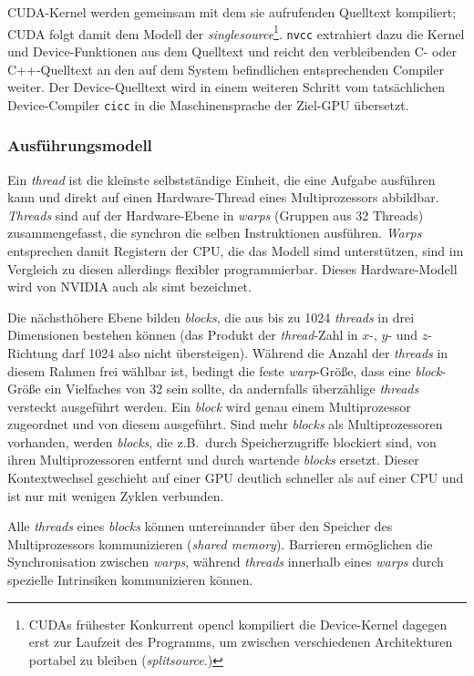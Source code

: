 CUDA-Kernel werden gemeinsam mit dem sie aufrufenden Quelltext kompiliert; CUDA
folgt damit dem Modell der \textit{\gls{singlesource}}\footnote{CUDAs frühester
Konkurrent \gls{opencl} kompiliert die Device-Kernel dagegen erst zur Laufzeit
des Programms, um zwischen verschiedenen Architekturen portabel zu bleiben
(\textit{\gls{splitsource}}.)}. \texttt{nvcc} extrahiert dazu die Kernel und
Device-Funktionen aus dem Quelltext und reicht den verbleibenden C- oder
C++-Quelltext an den auf dem System befindlichen entsprechenden Compiler
weiter. Der Device-Quelltext wird in einem weiteren Schritt vom tatsächlichen
Device-Compiler \texttt{cicc} in die Maschinensprache der Ziel-GPU übersetzt.

\subsubsection{Ausführungsmodell}

Ein \textit{thread} ist die kleinste selbstständige Einheit, die eine Aufgabe
ausführen kann und direkt auf einen Hardware-Thread eines Multiprozessors
abbildbar. \textit{Threads} sind auf der Hardware-Ebene in \textit{warps}
(Gruppen aus 32 Threads) zusammengefasst, die synchron die selben Instruktionen
ausführen. \textit{Warps} entsprechen damit Registern der CPU, die das Modell
\gls{simd} unterstützen, sind im Vergleich zu diesen allerdings flexibler
programmierbar. Dieses Hardware-Modell wird von NVIDIA auch als \gls{simt}
bezeichnet.

Die nächsthöhere Ebene bilden \textit{blocks}, die aus bis zu \num{1024}
\textit{threads} in drei Dimensionen bestehen können (das Produkt der
\textit{thread}-Zahl in $x$-, $y$- und $z$-Richtung darf \num{1024} also nicht
übersteigen). Während die Anzahl der \textit{threads} in diesem Rahmen frei
wählbar ist, bedingt die feste \textit{warp}-Größe, dass eine
\textit{block}-Größe ein Vielfaches von 32 sein sollte, da andernfalls
überzählige \textit{threads} versteckt ausgeführt werden. Ein \textit{block}
wird genau einem Multiprozessor zugeordnet und von diesem ausgeführt. Sind mehr
\textit{blocks} als Multiprozessoren vorhanden, werden \textit{blocks}, die
z.B.\ durch Speicherzugriffe blockiert sind, von ihren Multiprozessoren entfernt
und durch wartende \textit{blocks} ersetzt. Dieser Kontextwechsel geschieht auf
einer GPU deutlich schneller als auf einer CPU und ist nur mit wenigen Zyklen
verbunden.

Alle \textit{threads} eines \textit{blocks} können untereinander über den
Speicher des Multiprozessors kommunizieren (\textit{shared memory}). Barrieren
ermöglichen die Synchronisation zwischen \textit{warps}, während
\textit{threads} innerhalb eines \textit{warps} durch spezielle Intrinsiken
kommunizieren können.

